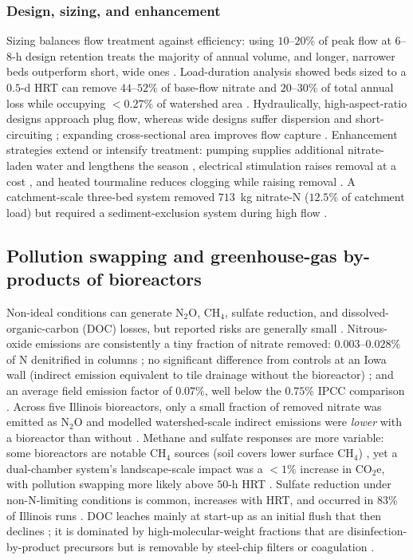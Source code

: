 \documentclass[11pt]{article}
\begin{document}
\subsubsection{Design, sizing, and enhancement}

Sizing balances flow treatment against efficiency: using $10$--$20\%$ of
peak flow at $6$--$8$-h design retention treats the majority of annual volume,
and longer, narrower beds outperform short, wide ones
\parencite{Christianson2013}. Load-duration analysis showed beds sized to a
$0.5$-d HRT can remove $44$--$52\%$ of base-flow nitrate and $20$--$30\%$ of
total annual loss while occupying $<0.27\%$ of watershed area
\parencite{Moorman2015}. Hydraulically, high-aspect-ratio designs approach
plug flow, whereas wide designs suffer dispersion and short-circuiting
\parencite{deOliveira2023,Dougherty2020b}; expanding cross-sectional area
improves flow capture \parencite{Maxwell2022}. Enhancement strategies extend
or intensify treatment: pumping supplies additional nitrate-laden water and
lengthens the season \parencite{Hartfiel2023,DíazGarcía2025}, electrical
stimulation raises removal at a cost \parencite{Law2018}, and heated
tourmaline reduces clogging while raising removal \parencite{Ma2021}. A
catchment-scale three-bed system removed $713$~kg nitrate-N ($12.5\%$ of
catchment load) but required a sediment-exclusion system during high flow
\parencite{Feyereisen2023}.

\subsection{Pollution swapping and greenhouse-gas by-products of bioreactors}

Non-ideal conditions can generate N$_2$O, CH$_4$, sulfate reduction, and
dissolved-organic-carbon (DOC) losses, but reported risks are generally small
\parencite{Hartfiel2022}. Nitrous-oxide emissions are consistently a tiny
fraction of nitrate removed: $0.003$--$0.028\%$ of N denitrified in columns
\parencite{Greenan2009}; no significant difference from controls at an Iowa
wall (indirect emission equivalent to tile drainage without the bioreactor)
\parencite{Moorman2010}; and an average field emission factor of $0.07\%$,
well below the $0.75\%$ IPCC comparison \parencite{Bock2018}. Across five
Illinois bioreactors, only a small fraction of removed nitrate was emitted as
N$_2$O and modelled watershed-scale indirect emissions were \emph{lower} with
a bioreactor than without \parencite{Brunton2024}. Methane and sulfate
responses are more variable: some bioreactors are notable CH$_4$ sources
(soil covers lower surface CH$_4$) \parencite{Brunton2024}, yet a dual-chamber
system's landscape-scale impact was a $<1\%$ increase in CO$_2$e, with
pollution swapping more likely above $50$-h HRT \parencite{Hartfiel2023b}.
Sulfate reduction under non-N-limiting conditions is common, increases with
HRT, and occurred in $83\%$ of Illinois runs
\parencite{Bell2015,Povilaitis2020,Rivas2020}. DOC leaches mainly at
start-up as an initial flush that then declines
\parencite{Abusallout2017,Rivas2020,Greenan2009}; it is dominated by
high-molecular-weight fractions that are disinfection-by-product precursors
but is removable by steel-chip filters or coagulation \parencite{Abusallout2017}.
\end{document}
